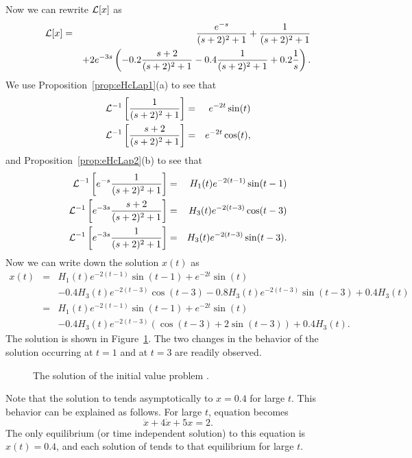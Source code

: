 Now we can rewrite ${\cal L}[x]$ as
\begin{eqnarray*}
{\cal L}[x] &=& \frac{e^{-s}}{(s+2)^2+1}+ \frac{1}{(s+2)^2+1}\\
&& +2e^{-3s}\left(-0.2\frac{s+2}{(s+2)^2+1}-0.4\frac{1}{(s+2)^2+1}
+0.2\frac{1}{s}\right).
\end{eqnarray*}
We use Proposition~\ref{prop:eHcLap1}(a) to see that
\begin{eqnarray*}
{\cal L}^{-1}\left[\frac{1}{(s+2)^2+1}\right]&=&
e^{-2t}\sin(t)\\
{\cal L}^{-1}\left[\frac{s+2}{(s+2)^2+1}\right]&=&
e^{-2t}\cos(t),
\end{eqnarray*}
and Proposition~\ref{prop:eHcLap2}(b) to see that
\begin{eqnarray*}
{\cal L}^{-1}\left[e^{-s}\frac{1}{(s+2)^2+1}\right]&=&
H_1(t)e^{-2(t-1)}\sin(t-1)\\
{\cal L}^{-1}\left[e^{-3s}\frac{s+2}{(s+2)^2+1}\right]&=&
H_3(t)e^{-2(t-3)}\cos(t-3)\\
{\cal L}^{-1}\left[e^{-3s}\frac{1}{(s+2)^2+1}\right]&=&
H_3(t)e^{-2(t-3)}\sin(t-3).
\end{eqnarray*}
Now we can write down the solution $x(t)$ as
\begin{eqnarray*}
x(t) &=& H_1(t)e^{-2(t-1)}\sin(t-1)+e^{-2t}\sin(t)\\
&&-0.4 H_3(t)e^{-2(t-3)}\cos(t-3) -0.8 H_3(t)e^{-2(t-3)}\sin(t-3)
+0.4 H_3(t)\\
&=& H_1(t)e^{-2(t-1)}\sin(t-1)+e^{-2t}\sin(t)\\
&& -0.4 H_3(t)e^{-2(t-3)}(\cos(t-3)+2\sin(t-3))+0.4 H_3(t).
\end{eqnarray*}
The solution is shown in Figure~\ref{fig:lapallsol}.
The two changes in the behavior of the solution occurring at 
$t=1$ and at $t=3$ are readily observed.  
\begin{figure}[htb]
           \centerline{%
           }
           \caption{The solution of the initial value problem
           \protect{}.}
           \label{fig:lapallsol}
\end{figure}

Note that the solution to  tends asymptotically to 
$x=0.4$  for large $t$.  This behavior can be explained as follows.  For large 
$t$, equation  becomes
\[
\ddot x + 4\dot x +5x = 2.
\]
The only equilibrium (or time independent solution) to this equation is
$x(t)=0.4$, and each solution of  tends to that equilibrium 
for large $t$.


